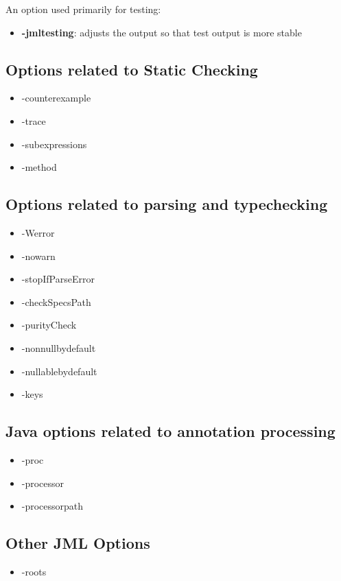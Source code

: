 An option used primarily for testing:
\begin{itemize}[noitemsep,nolistsep]
\item \textbf{-jmltesting}: adjusts the output so that test output is more stable
\end{itemize}

\subsection{Options related to Static Checking}
\begin{itemize}
\item -counterexample
\item -trace
\item -subexpressions
\item -method
\end{itemize}

\subsection{Options related to parsing and typechecking}
\begin{itemize}
\item -Werror
\item -nowarn
\item -stopIfParseError
\item -checkSpecsPath
\item -purityCheck
\item -nonnullbydefault
\item -nullablebydefault
\item -keys
\end{itemize}

\subsection{Java options related to annotation processing}
\begin{itemize}
\item -proc
\item -processor
\item -processorpath
\end{itemize}

\subsection{Other JML Options}
\begin{itemize}
\item -roots
\end{itemize}



